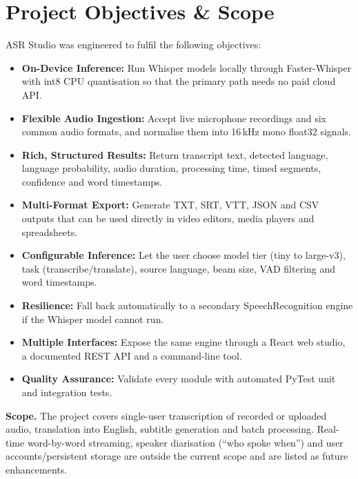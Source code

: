 \documentclass[11pt,a4paper]{article}
\begin{document}
\section{Project Objectives \& Scope}
ASR Studio was engineered to fulfil the following objectives:
\begin{itemize}[leftmargin=1.2em]
  \item[$\blacksquare$] \textbf{On-Device Inference:} Run Whisper models locally through Faster-Whisper with int8 CPU quantisation so that the primary path needs no paid cloud API.
  \item[$\blacksquare$] \textbf{Flexible Audio Ingestion:} Accept live microphone recordings and six common audio formats, and normalise them into 16\,kHz mono float32 signals.
  \item[$\blacksquare$] \textbf{Rich, Structured Results:} Return transcript text, detected language, language probability, audio duration, processing time, timed segments, confidence and word timestamps.
  \item[$\blacksquare$] \textbf{Multi-Format Export:} Generate TXT, SRT, VTT, JSON and CSV outputs that can be used directly in video editors, media players and spreadsheets.
  \item[$\blacksquare$] \textbf{Configurable Inference:} Let the user choose model tier (tiny to large-v3), task (transcribe/translate), source language, beam size, VAD filtering and word timestamps.
  \item[$\blacksquare$] \textbf{Resilience:} Fall back automatically to a secondary SpeechRecognition engine if the Whisper model cannot run.
  \item[$\blacksquare$] \textbf{Multiple Interfaces:} Expose the same engine through a React web studio, a documented REST API and a command-line tool.
  \item[$\blacksquare$] \textbf{Quality Assurance:} Validate every module with automated PyTest unit and integration tests.
\end{itemize}

\textbf{Scope.} The project covers single-user transcription of recorded or uploaded audio, translation into English, subtitle generation and batch processing. Real-time word-by-word streaming, speaker diarisation (``who spoke when'') and user accounts/persistent storage are outside the current scope and are listed as future enhancements.

\end{document}
